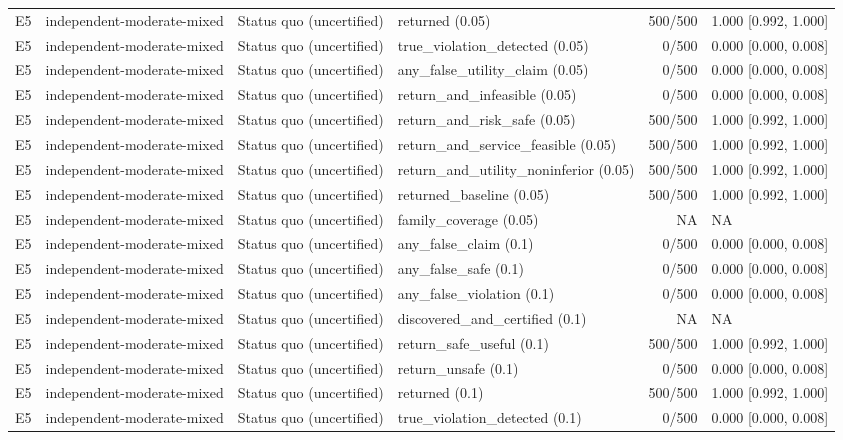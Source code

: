 \begin{longtable}{p{.04\linewidth}p{.18\linewidth}p{.19\linewidth}p{.16\linewidth}r p{.21\linewidth}}
E5 & independent-moderate-mixed & Status quo (uncertified) & returned (0.05) & 500/500 & 1.000 [0.992, 1.000]\\
E5 & independent-moderate-mixed & Status quo (uncertified) & true\_violation\_detected (0.05) & 0/500 & 0.000 [0.000, 0.008]\\
E5 & independent-moderate-mixed & Status quo (uncertified) & any\_false\_utility\_claim (0.05) & 0/500 & 0.000 [0.000, 0.008]\\
E5 & independent-moderate-mixed & Status quo (uncertified) & return\_and\_infeasible (0.05) & 0/500 & 0.000 [0.000, 0.008]\\
E5 & independent-moderate-mixed & Status quo (uncertified) & return\_and\_risk\_safe (0.05) & 500/500 & 1.000 [0.992, 1.000]\\
E5 & independent-moderate-mixed & Status quo (uncertified) & return\_and\_service\_feasible (0.05) & 500/500 & 1.000 [0.992, 1.000]\\
E5 & independent-moderate-mixed & Status quo (uncertified) & return\_and\_utility\_noninferior (0.05) & 500/500 & 1.000 [0.992, 1.000]\\
E5 & independent-moderate-mixed & Status quo (uncertified) & returned\_baseline (0.05) & 500/500 & 1.000 [0.992, 1.000]\\
E5 & independent-moderate-mixed & Status quo (uncertified) & family\_coverage (0.05) & NA & NA\\
E5 & independent-moderate-mixed & Status quo (uncertified) & any\_false\_claim (0.1) & 0/500 & 0.000 [0.000, 0.008]\\
E5 & independent-moderate-mixed & Status quo (uncertified) & any\_false\_safe (0.1) & 0/500 & 0.000 [0.000, 0.008]\\
E5 & independent-moderate-mixed & Status quo (uncertified) & any\_false\_violation (0.1) & 0/500 & 0.000 [0.000, 0.008]\\
E5 & independent-moderate-mixed & Status quo (uncertified) & discovered\_and\_certified (0.1) & NA & NA\\
E5 & independent-moderate-mixed & Status quo (uncertified) & return\_safe\_useful (0.1) & 500/500 & 1.000 [0.992, 1.000]\\
E5 & independent-moderate-mixed & Status quo (uncertified) & return\_unsafe (0.1) & 0/500 & 0.000 [0.000, 0.008]\\
E5 & independent-moderate-mixed & Status quo (uncertified) & returned (0.1) & 500/500 & 1.000 [0.992, 1.000]\\
E5 & independent-moderate-mixed & Status quo (uncertified) & true\_violation\_detected (0.1) & 0/500 & 0.000 [0.000, 0.008]\\

\end{longtable}
